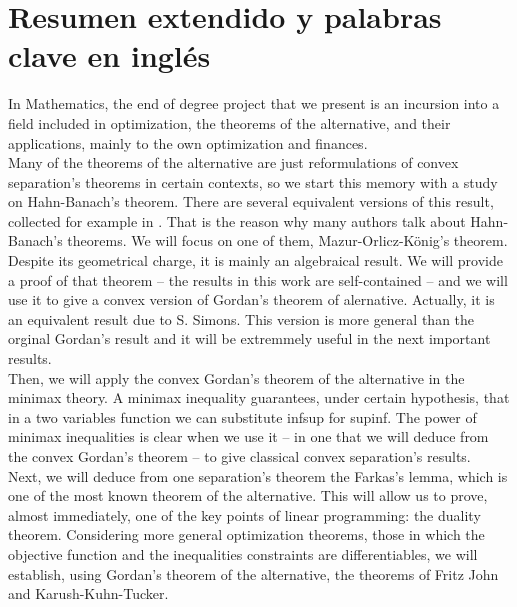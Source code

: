 \chapter{Resumen extendido y palabras clave en inglés}
In Mathematics, the end of degree project that we present is an incursion into a field included in optimization, the theorems of the alternative, and their applications, mainly to the own optimization and finances.\\

Many of the theorems of the alternative are just reformulations of convex separation's theorems in certain contexts, so we start this memory with a study on Hahn-Banach's theorem. There are several equivalent versions of this result, collected for example in \cite{schechter1996handbook}. That is the reason why many authors talk about Hahn-Banach's theorems. We will focus on one of them, Mazur-Orlicz-König's theorem. Despite its geometrical charge, it is mainly an algebraical result. We will provide a proof of that theorem -- the results in this work are self-contained --  and we will use it to give a convex version  of Gordan's theorem of alernative. Actually, it is an equivalent result due to S. Simons. This version is more general than the orginal Gordan's result and it will be extremmely useful in the next important results. \\ 

Then, we will apply the convex Gordan's theorem of the alternative in the minimax theory. A minimax inequality guarantees, under certain hypothesis, that in a two variables function we can substitute inf\hspace{0.5mm}sup for sup\hspace{0.5mm}inf. The power of minimax inequalities is clear when we use it -- in one that we will deduce from the convex Gordan's theorem -- to give classical convex separation's results. \\

Next, we will deduce from one separation's theorem the Farkas's lemma, which is one of the most known theorem of the alternative. This will allow us to prove, almost immediately, one of the key points of linear programming: the duality theorem. Considering more general optimization theorems, those in which the objective function and the inequalities constraints are differentiables, we will establish, using Gordan's theorem of the alternative, the theorems of Fritz John and Karush-Kuhn-Tucker.\\

